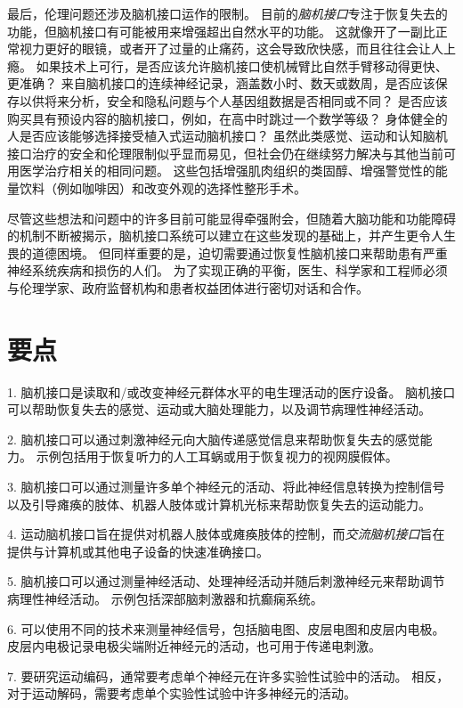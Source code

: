 最后，伦理问题还涉及脑机接口运作的限制。
目前的\textit{脑机接口}专注于恢复失去的功能，但脑机接口有可能被用来增强超出自然水平的功能。
这就像开了一副比正常视力更好的眼镜，或者开了过量的止痛药，这会导致欣快感，而且往往会让人上瘾。
如果技术上可行，是否应该允许脑机接口使机械臂比自然手臂移动得更快、更准确？
来自脑机接口的连续神经记录，涵盖数小时、数天或数周，是否应该保存以供将来分析，安全和隐私问题与个人基因组数据是否相同或不同？
是否应该购买具有预设内容的脑机接口，例如，在高中时跳过一个数学等级？
身体健全的人是否应该能够选择接受植入式运动脑机接口？
虽然此类感觉、运动和认知脑机接口治疗的安全和伦理限制似乎显而易见，但社会仍在继续努力解决与其他当前可用医学治疗相关的相同问题。
这些包括增强肌肉组织的类固醇、增强警觉性的能量饮料（例如咖啡因）和改变外观的选择性整形手术。


尽管这些想法和问题中的许多目前可能显得牵强附会，但随着大脑功能和功能障碍的机制不断被揭示，脑机接口系统可以建立在这些发现的基础上，并产生更令人生畏的道德困境。
但同样重要的是，迫切需要通过恢复性脑机接口来帮助患有严重神经系统疾病和损伤的人们。
为了实现正确的平衡，医生、科学家和工程师必须与伦理学家、政府监督机构和患者权益团体进行密切对话和合作。



\section{要点}

1. 脑机接口是读取和/或改变神经元群体水平的电生理活动的医疗设备。
脑机接口可以帮助恢复失去的感觉、运动或大脑处理能力，以及调节病理性神经活动。


2. 脑机接口可以通过刺激神经元向大脑传递感觉信息来帮助恢复失去的感觉能力。
示例包括用于恢复听力的人工耳蜗或用于恢复视力的视网膜假体。


3. 脑机接口可以通过测量许多单个神经元的活动、将此神经信息转换为控制信号以及引导瘫痪的肢体、机器人肢体或计算机光标来帮助恢复失去的运动能力。


4. 运动脑机接口旨在提供对机器人肢体或瘫痪肢体的控制，而\textit{交流脑机接口}旨在提供与计算机或其他电子设备的快速准确接口。


5. 脑机接口可以通过测量神经活动、处理神经活动并随后刺激神经元来帮助调节病理性神经活动。
示例包括深部脑刺激器和抗癫痫系统。


6. 可以使用不同的技术来测量神经信号，包括脑电图、皮层电图和皮层内电极。
皮层内电极记录电极尖端附近神经元的活动，也可用于传递电刺激。


7. 要研究运动编码，通常要考虑单个神经元在许多实验性试验中的活动。
相反，对于运动解码，需要考虑单个实验性试验中许多神经元的活动。


